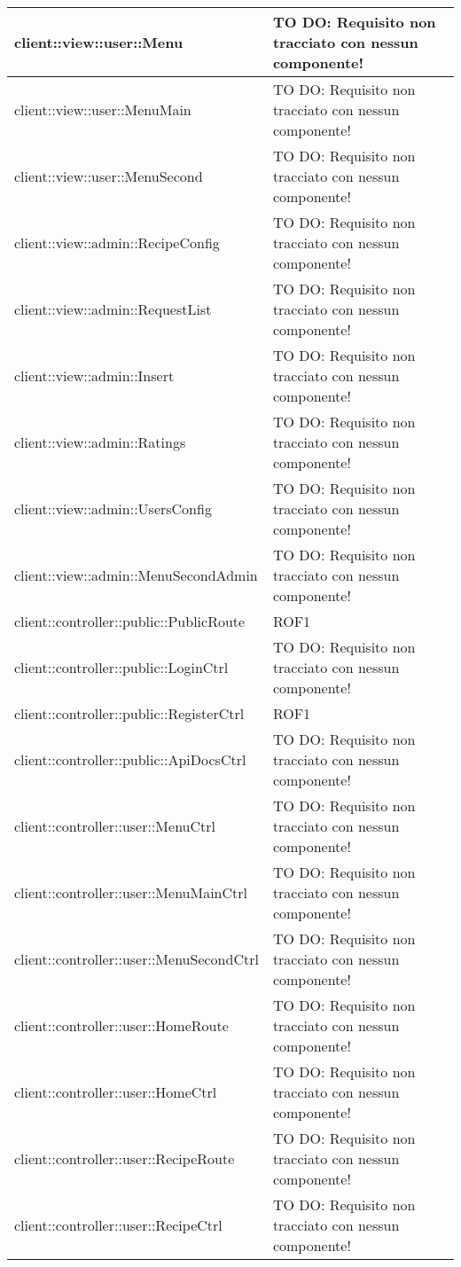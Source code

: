 \begin{center}
\begin{longtable}{| p{11cm} | p{2.5cm} |}
\hline
client::view::user::Menu & TO DO: Requisito non tracciato con nessun componente! \\
\hline
client::view::user::MenuMain & TO DO: Requisito non tracciato con nessun componente! \\
\hline
client::view::user::MenuSecond & TO DO: Requisito non tracciato con nessun componente! \\
\hline
client::view::admin::RecipeConfig & TO DO: Requisito non tracciato con nessun componente! \\
\hline
client::view::admin::RequestList & TO DO: Requisito non tracciato con nessun componente! \\
\hline
client::view::admin::Insert & TO DO: Requisito non tracciato con nessun componente! \\
\hline
client::view::admin::Ratings & TO DO: Requisito non tracciato con nessun componente! \\
\hline
client::view::admin::UsersConfig & TO DO: Requisito non tracciato con nessun componente! \\
\hline
client::view::admin::MenuSecondAdmin & TO DO: Requisito non tracciato con nessun componente! \\
\hline
client::controller::public::PublicRoute & ROF1 \\
\hline
client::controller::public::LoginCtrl & TO DO: Requisito non tracciato con nessun componente! \\
\hline
client::controller::public::RegisterCtrl & ROF1 \\
\hline
client::controller::public::ApiDocsCtrl & TO DO: Requisito non tracciato con nessun componente! \\
\hline
client::controller::user::MenuCtrl & TO DO: Requisito non tracciato con nessun componente! \\
\hline
client::controller::user::MenuMainCtrl & TO DO: Requisito non tracciato con nessun componente! \\
\hline
client::controller::user::MenuSecondCtrl & TO DO: Requisito non tracciato con nessun componente! \\
\hline
client::controller::user::HomeRoute & TO DO: Requisito non tracciato con nessun componente! \\
\hline
client::controller::user::HomeCtrl & TO DO: Requisito non tracciato con nessun componente! \\
\hline
client::controller::user::RecipeRoute & TO DO: Requisito non tracciato con nessun componente! \\
\hline
client::controller::user::RecipeCtrl & TO DO: Requisito non tracciato con nessun componente! \\

\end{longtable}
\end{center}
